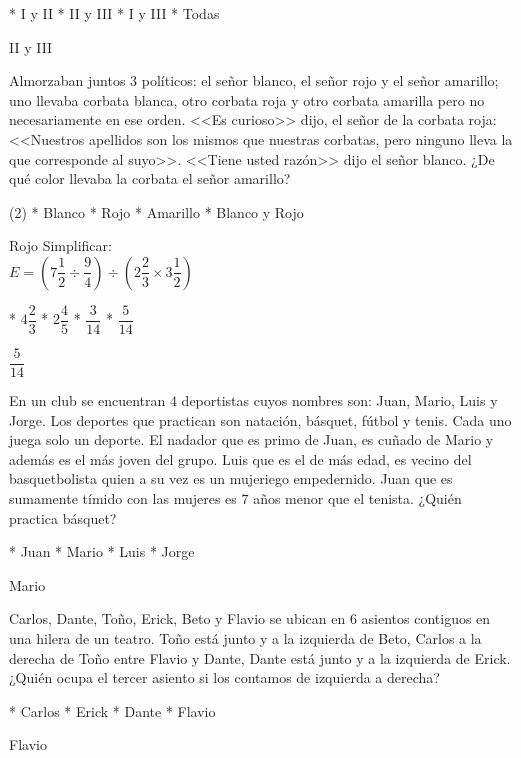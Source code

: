 \begin{task}
	* I y II
	* II y III
	* I y III
	* Todas
\end{task}
II y III
\begin{mini}[.8]
	Almorzaban juntos $3$ pol\'iticos: el señor blanco, el señor rojo y el señor amarillo; uno llevaba corbata blanca, otro corbata roja y otro corbata amarilla pero no necesariamente en ese orden. <<Es curioso>> dijo, el señor de la corbata roja: <<Nuestros apellidos son los mismos que nuestras corbatas, pero ninguno lleva la que corresponde al suyo>>. <<Tiene usted raz\'on>> dijo el señor blanco. ¿De qu\'e color llevaba la corbata el señor amarillo?
\end{mini}
\begin{mini}[.6]
	\begin{enum}(2)
		* Blanco
		* Rojo
		* Amarillo
		* Blanco y Rojo
	\end{enum}
\end{mini}
Rojo
Simplificar: \vspace{5pt} \\
$E=\left(7\dfrac{1}{2}\div\dfrac{9}{4}\right)\div\left(2\dfrac{2}{3}\times 3\dfrac{1}{2}\right)$
\begin{task}
	* $4\dfrac{2}{3}$
	* $2\dfrac{4}{5}$
	* $\dfrac{3}{14}$
	* $\dfrac{5}{14}$
\end{task}
$\dfrac{5}{14}$
\begin{mini}[.8]
	En un club se encuentran $4$ deportistas cuyos nombres son: Juan, Mario, Luis y Jorge. Los deportes que practican son nataci\'on, b\'asquet, f\'utbol y tenis. Cada uno juega solo un deporte. El nadador que es primo de Juan, es cuñado de Mario y adem\'as es el m\'as joven del grupo. Luis que es el de m\'as edad, es vecino del basquetbolista quien a su vez es un mujeriego empedernido. Juan que es sumamente t\'imido con las mujeres es $7$ años menor que el tenista. ¿Qui\'en practica b\'asquet?
\end{mini}
\begin{task}
	* Juan
	* Mario
	* Luis
	* Jorge
\end{task}
Mario
\begin{mini}[.7]
	Carlos, Dante, Toño, Erick, Beto y Flavio se ubican en $6$ asientos contiguos en una hilera de un teatro. Toño est\'a junto y a la izquierda de Beto, Carlos a la derecha de Toño entre Flavio y Dante, Dante est\'a junto y a la izquierda de Erick. ¿Qui\'en ocupa el tercer asiento si los contamos de izquierda a derecha?
\end{mini}
\begin{mini}[.7]
	\begin{enum*}
		* Carlos
		* Erick
		* Dante
		* Flavio
	\end{enum*}
\end{mini}
Flavio
